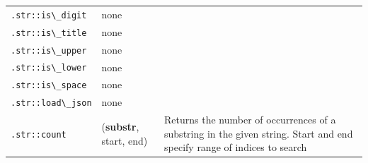 {\begin{table}[t]
\begin{tabular}{l p{3cm} p{6cm}}
            \lstinline{.str::is\_digit}                           & none                                                                                                                                                           &                                                                                                        \\
            \lstinline{.str::is\_title}                           & none                                                                                                                                                           &                                                                                                        \\
            \lstinline{.str::is\_upper}                           & none                                                                                                                                                           &                                                                                                        \\
            \lstinline{.str::is\_lower}                           & none                                                                                                                                                           &                                                                                                        \\
            \lstinline{.str::is\_space}                           & none                                                                                                                                                           &                                                                                                        \\
            \lstinline{.str::load\_json}                          & none                                                                                                                                                           &                                                                                                        \\
            \lstinline{.str::count}      & (\textbf{substr}, start, end)            & Returns the number of occurrences of a substring in the given string. Start and end specify range of indices to search                                                                                                                                                  \\

\end{tabular}
\end{table}}

